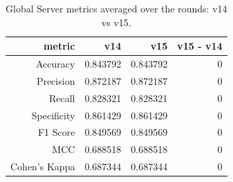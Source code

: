 \begin{table}[t]
\centering
\small
\caption{Global Server metrics averaged over the rounds: v14 vs v15.}
\label{tab:smpc_metrics}
\begin{tabular}{rrrr}
\toprule
metric & v14 & v15 & v15 - v14 \\
\midrule
Accuracy & 0.843792 & 0.843792 & 0 \\
Precision & 0.872187 & 0.872187 & 0 \\
Recall & 0.828321 & 0.828321 & 0 \\
Specificity & 0.861429 & 0.861429 & 0 \\
F1 Score & 0.849569 & 0.849569 & 0 \\
MCC & 0.688518 & 0.688518 & 0 \\
Cohen's Kappa & 0.687344 & 0.687344 & 0 \\
\bottomrule
\end{tabular}
\end{table}
